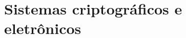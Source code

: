 \section{Sistemas criptográficos e eletrônicos}
\label{sec:sistemas criptográficos e eletrônicos}




